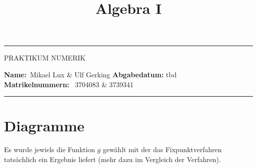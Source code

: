 \documentclass[10pt]{scrartcl}
\title{Algebra I}
\newcommand{\1}{1\hspace{-0,9ex}1}
\begin{document}
\begin{center}
	\hrule
	\vspace{.4cm}
	{\large PRAKTIKUM NUMERIK}
\end{center}
{\textbf{Name:}\ Mikael Lux \& Ulf Gerking\hspace{\fill} \textbf{Abgabedatum:} tbd}\\
{ \textbf{Matrikelnummern:}} \ 3704083  \& 3739341 \hspace{\fill} \\
	\hrule
	\section*{Diagramme}
	Es wurde jewiels die Funktion $g$ gewählt mit der das Fixpunktverfahren tatsächlich ein Ergebnis liefert (mehr dazu im Vergleich der Verfahren).
	
\end{document}
